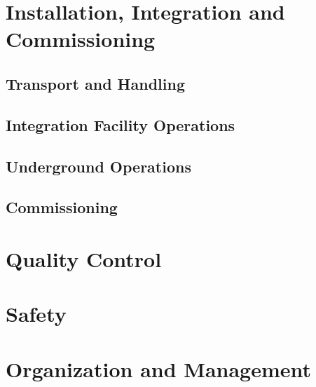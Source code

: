 \section{Installation, Integration and Commissioning}
\label{sec:fddp-slow-cryo-install}

\subsection{Transport and Handling}
\label{sec:fddp-slow-cryo-install-transport}


\subsection{Integration Facility Operations}
\label{sec:fddp-slow-cryo-install-facil-ops}


\subsection{Underground Operations}
\label{sec:fddp-slow-cryo-install-undergr}

\subsection{Commissioning}
\label{sec:fddp-slow-cryo-install-commiss}



\section{Quality Control}
\label{sec:fddp-slow-cryo-qc}




\section{Safety}
\label{sec:fddp-slow-cryo-safety}



\section{Organization and Management}
\label{sec:fddp-slow-cryo-org}

